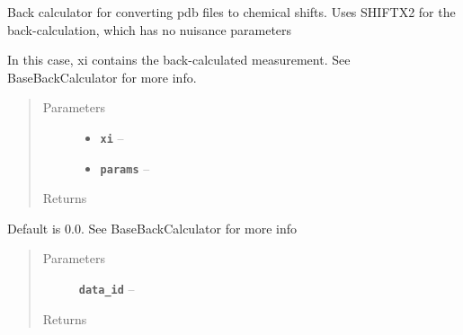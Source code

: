 \documentclass[letterpaper,10pt,english]{sphinxmanual}
\begin{document}
\begin{fulllineitems}
\label{modules:backcalc.ShiftBackCalc}
Back calculator for converting pdb files to chemical shifts.
Uses SHIFTX2 for the back-calculation, which has no nuisance
parameters

\begin{fulllineitems}
\label{modules:backcalc.ShiftBackCalc.back_calc}
In this case, xi contains the back-calculated measurement.
See BaseBackCalculator for more info.
\begin{quote}\begin{description}
\item[{Parameters}] \leavevmode\begin{itemize}
\item {} 
\textbf{\texttt{xi}} -- 

\item {} 
\textbf{\texttt{params}} -- 

\end{itemize}

\item[{Returns}] \leavevmode


\end{description}\end{quote}

\end{fulllineitems}


\begin{fulllineitems}
\label{modules:backcalc.ShiftBackCalc.get_default_err}
Default is 0.0. See BaseBackCalculator for more info
\begin{quote}\begin{description}
\item[{Parameters}] \leavevmode
\textbf{\texttt{data\_id}} -- 

\item[{Returns}] \leavevmode


\end{description}\end{quote}

\end{fulllineitems}


\end{fulllineitems}
\end{document}
